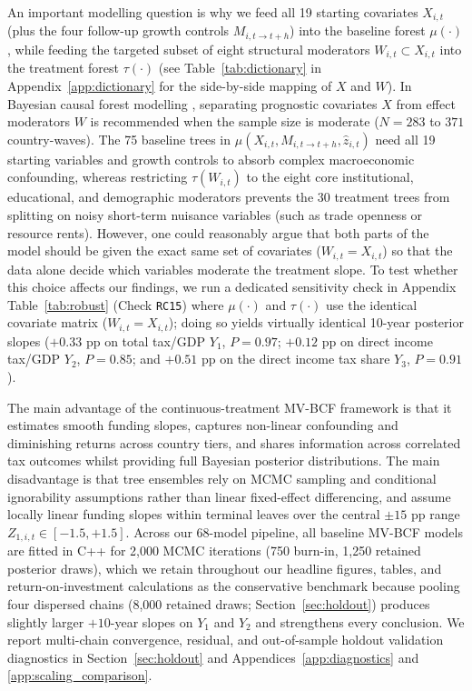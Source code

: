 \documentclass[11pt,a4paper]{article}
\begin{document}
An important modelling question is why we feed all 19 starting covariates $X_{i,t}$ (plus the four follow-up growth controls $M_{i,t\to t+h}$) into the baseline forest $\mu(\cdot)$, while feeding the targeted subset of eight structural moderators $W_{i,t} \subset X_{i,t}$ into the treatment forest $\tau(\cdot)$ (see Table~\ref{tab:dictionary} in Appendix~\ref{app:dictionary} for the side-by-side mapping of $X$ and $W$). In Bayesian causal forest modelling \citep{hahn2020bayesian, mcjames2024mvbcf}, separating prognostic covariates $X$ from effect moderators $W$ is recommended when the sample size is moderate ($N = 283$ to $371$ country-waves). The 75 baseline trees in $\mu(X_{i,t}, M_{i,t\to t+h}, \hat{z}_{i,t})$ need all 19 starting variables and growth controls to absorb complex macroeconomic confounding, whereas restricting $\tau(W_{i,t})$ to the eight core institutional, educational, and demographic moderators prevents the 30 treatment trees from splitting on noisy short-term nuisance variables (such as trade openness or resource rents). However, one could reasonably argue that both parts of the model should be given the exact same set of covariates ($W_{i,t} = X_{i,t}$) so that the data alone decide which variables moderate the treatment slope. To test whether this choice affects our findings, we run a dedicated sensitivity check in Appendix Table~\ref{tab:robust} (Check \texttt{RC15}) where $\mu(\cdot)$ and $\tau(\cdot)$ use the identical covariate matrix ($W_{i,t} = X_{i,t}$); doing so yields virtually identical 10-year posterior slopes ($+0.33$ pp on total tax/GDP $Y_1$, $P = 0.97$; $+0.12$ pp on direct income tax/GDP $Y_2$, $P = 0.85$; and $+0.51$ pp on the direct income tax share $Y_3$, $P = 0.91$).

The main advantage of the continuous-treatment MV-BCF framework is that it estimates smooth funding slopes, captures non-linear confounding and diminishing returns across country tiers, and shares information across correlated tax outcomes whilst providing full Bayesian posterior distributions. The main disadvantage is that tree ensembles rely on MCMC sampling and conditional ignorability assumptions rather than linear fixed-effect differencing, and assume locally linear funding slopes within terminal leaves over the central $\pm 15$ pp range $Z_{1,i,t} \in [-1.5, +1.5]$. Across our 68-model pipeline, all baseline MV-BCF models are fitted in C++ for 2,000 MCMC iterations (750 burn-in, 1,250 retained posterior draws), which we retain throughout our headline figures, tables, and return-on-investment calculations as the conservative benchmark because pooling four dispersed chains (8,000 retained draws; Section~\ref{sec:holdout}) produces slightly larger $+10$-year slopes on $Y_1$ and $Y_2$ and strengthens every conclusion. We report multi-chain convergence, residual, and out-of-sample holdout validation diagnostics in Section~\ref{sec:holdout} and Appendices~\ref{app:diagnostics} and \ref{app:scaling_comparison}.
\end{document}
